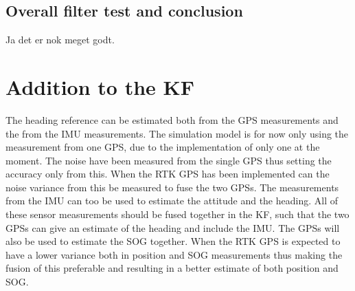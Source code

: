 \subsection{Overall filter test and conclusion}
Ja det er nok meget godt.

\section{Addition to the \acl{KF}}
The heading reference can be estimated both from the \ac{GPS} measurements and the from the \ac{IMU} measurements. The simulation model is for now only using the measurement from one \ac{GPS}, due to the implementation of only one at the moment. The noise have been measured from the single \ac{GPS} thus setting the accuracy only from this. When the \ac{RTK} \ac{GPS} has been implemented can the noise variance from this be measured to fuse the two \ac{GPS}s. The measurements from the \ac{IMU} can too be used to estimate the attitude and the heading. All of these sensor measurements should be fused together in the \ac{KF}, such that the two \ac{GPS}s can give an estimate of the heading and include the \ac{IMU}. The \ac{GPS}s will also be used to estimate the \ac{SOG} together. When the \ac{RTK} \ac{GPS} is expected to have a lower variance both in position and \ac{SOG} measurements thus making the fusion of this preferable and resulting in a better estimate of both position and \ac{SOG}.



